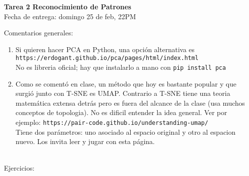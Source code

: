 \documentclass[12pt]{book}
\newcommand {\?}{?`}
\begin{document}
\specialaccent \mbox{} 
\begin{center}
{\Large \bf Tarea 2 Reconocimiento de Patrones} \\ Fecha de entrega: domingo  25 de feb, 22PM \mbox{} \vspace{0.5cm} \\


\end{center}

Comentarios generales: 
\begin{enumerate}
\item Si quieren hacer PCA en Python,  una opci\'on alternativa es  \\
\verb|https://erdogant.github.io/pca/pages/html/index.html| \\
No es libreria oficial; hay que instalarlo a mano con \verb|pip install pca|
\item 
Como se coment\'o en clase, un m\'etodo que hoy es bastante popular y que surgi\'o  junto con T-SNE es UMAP. Contrario a T-SNE tiene una teoria matem\'atica extensa detr\'as pero es fuera del alcance de la clase (usa muchos conceptos de topologia). No es dificil entender la idea general. Ver por ejemplo: 
\verb|https://pair-code.github.io/understanding-umap/ | \\ Tiene dos par\'ametros: uno asociado al espacio original y otro  al espacion nuevo. Los invita leer y jugar con esta p\'agina.
\end{enumerate} \\


Ejercicios: 
\end{document}
